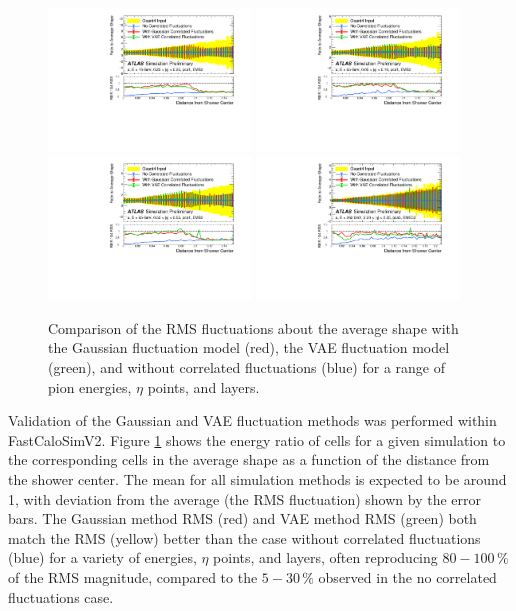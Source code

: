 \begin{figure}[ht!]
\centering
\includegraphics[width=0.48\textwidth]{figures/FCS-fig-03.pdf}
\includegraphics[width=0.48\textwidth]{figures/FCS-fig-04.pdf}
\includegraphics[width=0.48\textwidth]{figures/FCS-fig-05.pdf}
\includegraphics[width=0.48\textwidth]{figures/FCS-fig-06.pdf}
\caption{Comparison of the RMS fluctuations about the average shape with the Gaussian fluctuation model (red), the VAE fluctuation model (green), and without correlated fluctuations (blue) for a range of pion energies, $\eta$ points, and layers.}
\label{fig-5} 
\end{figure}

Validation of the Gaussian and VAE fluctuation methods was performed within FastCaloSimV2. Figure \ref{fig-5} shows the energy ratio of cells for a given simulation to the corresponding cells in the average shape as a function of the distance from the shower center. The mean for all simulation methods is expected to be around 1, with deviation from the average (the RMS fluctuation) shown by the error bars. The Gaussian method RMS (red) and VAE method RMS (green) both match the \GEANT RMS (yellow) better than the case without correlated fluctuations (blue) for a variety of energies, $\eta$ points, and layers, often reproducing $80 - 100\,\%$ of the \GEANT RMS magnitude, compared to the $5 - 30\,\%$ observed in the no correlated fluctuations case.


